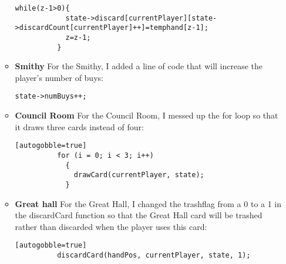 \documentclass[11pt,letterpaper]{article}
\begin{document}
\begin{enumerate}
\begin{itemize}[leftmargin=*]
        \begin{lstlisting}[breaklines=true]
          while(z-1>0){
            state->discard[currentPlayer][state->discardCount[currentPlayer]++]=temphand[z-1];
            z=z-1;
          }
        \end{lstlisting}

      \item \textbf{Smithy}
        For the Smithy, I added a line of code that will increase the player's number of buys:
        
        \begin{lstlisting}[breaklines=true]
          state->numBuys++;
        \end{lstlisting}

      \item \textbf{Council Room}
        For the Council Room, I messed up the for loop so that it draws three cards instead of four:
        \begin{lstlisting}[breaklines=true][autogobble=true]
          for (i = 0; i < 3; i++)
            {
              drawCard(currentPlayer, state);
            }
        \end{lstlisting}

      \item \textbf{Great hall}
        For the Great Hall, I changed the trashflag from a 0 to a 1 in the discardCard function so
        that the Great Hall card will be trashed rather than discarded when the player uses this
        card:
        \begin{lstlisting}[breaklines=true][autogobble=true]
          discardCard(handPos, currentPlayer, state, 1);
        \end{lstlisting}
    \end{itemize}
\end{enumerate}
\end{document}
